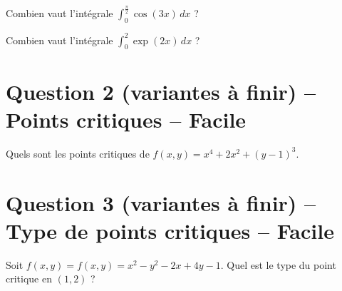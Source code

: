\documentclass[12pt,a4paper]{article}
\begin{document}
\begin{question}

Combien vaut l'intégrale $\int_0^{\frac\pi2} \cos(3x)\,dx$ ?


\begin{answers}  
    \bad{$\pi$}
\end{answers}
\end{question}


\begin{question}

Combien vaut l'intégrale $\int_0^2 \exp(2x)\,dx$ ?


\begin{answers}  
\end{answers}
\end{question}



\section{Question 2 (variantes à finir) -- Points critiques -- Facile}

\begin{question}

Quels sont les points critiques de $f(x,y) = x^4+2x^2+(y-1)^3.$


\begin{answers}  
\end{answers}
\end{question}



\section{Question 3 (variantes à finir) -- Type de points critiques -- Facile}


\begin{question}
Soit $f(x,y) = f(x,y) = x^2 - y^2 - 2x + 4y - 1.$
Quel est le type du point critique  en $(1,2)$ ?


\begin{answers}  
\end{answers}
\end{question}
\end{document}
